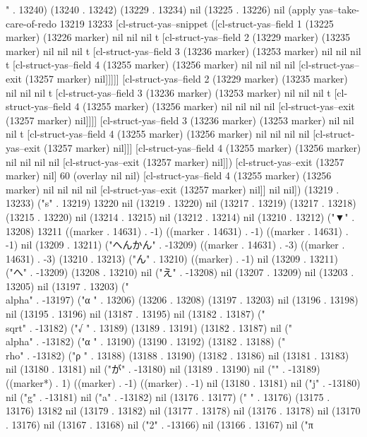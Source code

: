 {" . 13240) (13240 . 13242) (13229 . 13234) nil (13225 . 13226) nil (apply yas--take-care-of-redo 13219 13233 [cl-struct-yas--snippet ([cl-struct-yas--field 1 (13225 marker) (13226 marker) nil nil nil t [cl-struct-yas--field 2 (13229 marker) (13235 marker) nil nil nil t [cl-struct-yas--field 3 (13236 marker) (13253 marker) nil nil nil t [cl-struct-yas--field 4 (13255 marker) (13256 marker) nil nil nil nil [cl-struct-yas--exit (13257 marker) nil]]]]] [cl-struct-yas--field 2 (13229 marker) (13235 marker) nil nil nil t [cl-struct-yas--field 3 (13236 marker) (13253 marker) nil nil nil t [cl-struct-yas--field 4 (13255 marker) (13256 marker) nil nil nil nil [cl-struct-yas--exit (13257 marker) nil]]]] [cl-struct-yas--field 3 (13236 marker) (13253 marker) nil nil nil t [cl-struct-yas--field 4 (13255 marker) (13256 marker) nil nil nil nil [cl-struct-yas--exit (13257 marker) nil]]] [cl-struct-yas--field 4 (13255 marker) (13256 marker) nil nil nil nil [cl-struct-yas--exit (13257 marker) nil]]) [cl-struct-yas--exit (13257 marker) nil] 60 (overlay nil nil) [cl-struct-yas--field 4 (13255 marker) (13256 marker) nil nil nil nil [cl-struct-yas--exit (13257 marker) nil]] nil nil]) (13219 . 13233) ("s" . 13219) 13220 nil (13219 . 13220) nil (13217 . 13219) (13217 . 13218) (13215 . 13220) nil (13214 . 13215) nil (13212 . 13214) nil (13210 . 13212) ("▼" . 13208) 13211 ((marker . 14631) . -1) ((marker . 14631) . -1) ((marker . 14631) . -1) nil (13209 . 13211) ("へんかん" . -13209) ((marker . 14631) . -3) ((marker . 14631) . -3) (13210 . 13213) ("ん" . 13210) ((marker) . -1) nil (13209 . 13211) ("へ" . -13209) (13208 . 13210) nil ("え" . -13208) nil (13207 . 13209) nil (13203 . 13205) nil (13197 . 13203) ("\\alpha" . -13197) ("α
" . 13206) (13206 . 13208) (13197 . 13203) nil (13196 . 13198) nil (13195 . 13196) nil (13187 . 13195) nil (13182 . 13187) ("\\sqrt" . -13182) ("√
" . 13189) (13189 . 13191) (13182 . 13187) nil ("\\alpha" . -13182) ("α
" . 13190) (13190 . 13192) (13182 . 13188) ("\\rho" . -13182) ("ρ
" . 13188) (13188 . 13190) (13182 . 13186) nil (13181 . 13183) nil (13180 . 13181) nil ("が" . -13180) nil (13189 . 13190) nil ("}" . -13189) ((marker*) . 1) ((marker) . -1) ((marker) . -1) nil (13180 . 13181) nil ("j" . -13180) nil ("g" . -13181) nil ("a" . -13182) nil (13176 . 13177) (" " . 13176) (13175 . 13176) 13182 nil (13179 . 13182) nil (13177 . 13178) nil (13176 . 13178) nil (13170 . 13176) nil (13167 . 13168) nil ("2" . -13166) nil (13166 . 13167) nil ("π
